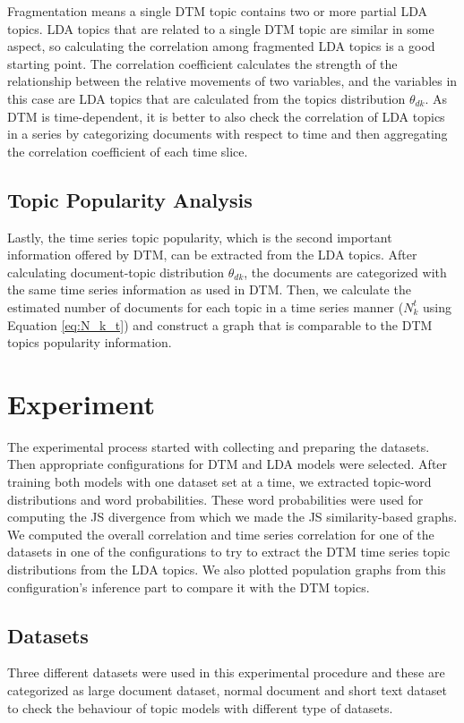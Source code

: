 \documentclass[a4paper]{report}
\begin{document}
Fragmentation means a single DTM topic contains two or more partial LDA topics. LDA topics that are related to a single DTM topic are similar in some aspect, so calculating the correlation among fragmented LDA topics is a good starting point. The correlation coefficient calculates the strength of the relationship between the relative movements of two variables, and the variables in this case are LDA topics that are calculated from the topics distribution $\theta_{dk}$. As DTM is time-dependent, it is better to also check the correlation of LDA topics in a series by categorizing documents with respect to time and then aggregating the correlation coefficient of each time slice.

\section{Topic Popularity Analysis}
Lastly, the time series topic popularity, which is the second important information offered by DTM, can be extracted from the LDA topics. After calculating document-topic distribution $\theta_{dk}$, the documents are categorized with the same time series information as used in DTM. Then, we calculate the estimated number of documents for each topic in a time series manner ($N^t_k$ using Equation \ref{eq:N_k_t}) and construct a graph that is comparable to the DTM topics popularity information.


\chapter{Experiment}
The experimental process started with collecting and preparing the datasets. Then appropriate configurations for DTM and LDA models were selected. After training both models with one dataset set at a time, we extracted topic-word distributions and word probabilities. These word probabilities were used for computing the JS divergence from which we made the JS similarity-based graphs. We computed the overall correlation and time series correlation for one of the datasets in one of the configurations to try to extract the DTM time series topic distributions from the LDA topics. We also plotted population graphs from this configuration's inference part to compare it with the DTM topics.

\section{Datasets}
Three different datasets were used in this experimental procedure and these are categorized as large document dataset, normal document and short text dataset to check the behaviour of topic models with different type of datasets. 
\end{document}
